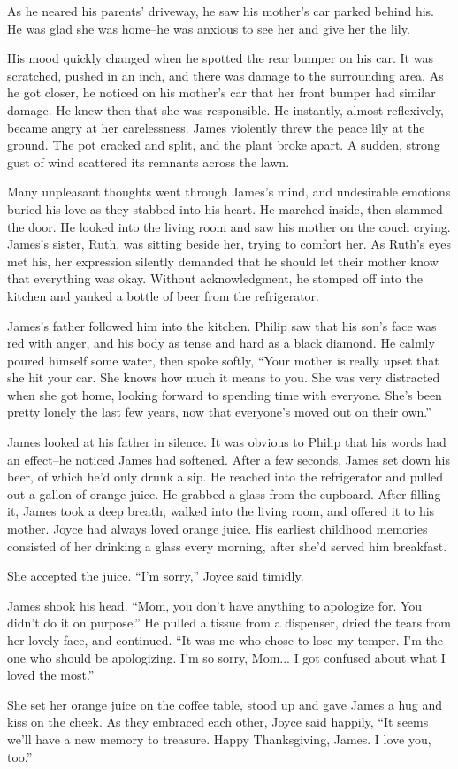 As he neared his parents' driveway, he saw his mother's car parked behind his. He was glad she was home--he was anxious to see her and give her the lily.

His mood quickly changed when he spotted the rear bumper on his car. It was scratched, pushed in an inch, and there was damage to the surrounding area. As he got closer, he noticed on his mother's car that her front bumper had similar damage. He knew then that she was responsible. He instantly, almost reflexively, became angry at her carelessness. James violently threw the peace lily at the ground. The pot cracked and split, and the plant broke apart. A sudden, strong gust of wind scattered its remnants across the lawn.

Many unpleasant thoughts went through James's mind, and undesirable emotions buried his love as they stabbed into his heart. He marched inside, then slammed the door. He looked into the living room and saw his mother on the couch crying. James's sister, Ruth, was sitting beside her, trying to comfort her. As Ruth's eyes met his, her expression silently demanded that he should let their mother know that everything was okay. Without acknowledgment, he stomped off into the kitchen and yanked a bottle of beer from the refrigerator.

James's father followed him into the kitchen. Philip saw that his son's face was red with anger, and his body as tense and hard as a black diamond. He calmly poured himself some water, then spoke softly,	“Your mother is really upset that she hit your car. She knows how much it means to you. She was very distracted when she got home, looking forward to spending time with everyone. She's been pretty lonely the last few years, now that everyone's moved out on their own.”

James looked at his father in silence. It was obvious to Philip that his words had an effect--he noticed James had softened. After a few seconds, James set down his beer, of which he'd only drunk a sip. He reached into the refrigerator and pulled out a gallon of orange juice. He grabbed a glass from the cupboard. After filling it, James took a deep breath, walked into the living room, and offered it to his mother. Joyce had always loved orange juice. His earliest childhood memories consisted of her drinking a glass every morning, after she'd served him breakfast.

She accepted the juice. “I'm sorry,” Joyce said timidly.

James shook his head. “Mom, you don't have anything to apologize for. You didn't do it on purpose.” He pulled a tissue from a dispenser, dried the tears from her lovely face, and continued. “It was me who chose to lose my temper. I'm the one who should be apologizing. I'm so sorry, Mom... I got confused about what I loved the most.”

She set her orange juice on the coffee table, stood up and gave James a hug and kiss on the cheek. As they embraced each other, Joyce said happily, “It seems we'll have a new memory to treasure. Happy Thanksgiving, James. I love you, too.”
